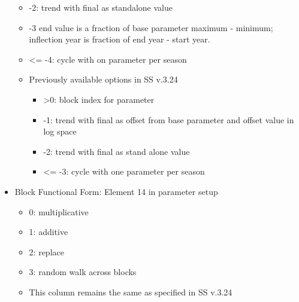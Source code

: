 \begin{itemize}
\begin{itemize}
\begin{itemize}
			\end{itemize}
			\item -2: trend with final as standalone value
			\item -3 end value is a fraction of base parameter maximum - minimum; inflection year is fraction of end year - start year.
			\item <= -4: cycle with on parameter per season
			\item Previously available options in SS v.3.24
			\begin{itemize}
				\item >0: block index for parameter
				\item -1: trend with final as offset from base parameter and offset value in log space
				\item -2: trend with final as stand alone value
				\item <= -3: cycle with one parameter per season
			\end{itemize}
		\end{itemize}
	\item Block Functional Form: Element 14 in parameter setup
		\begin{itemize}
			\item 0: multiplicative 
			\item 1: additive
			\item 2: replace
			\item 3: random walk across blocks
			\item This column remains the same as specified in SS v.3.24
		\end{itemize}
\end{itemize}

